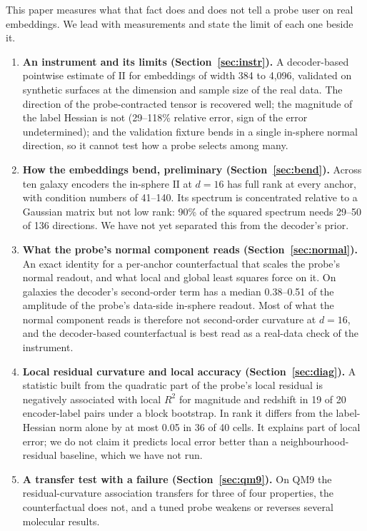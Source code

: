 \documentclass[10pt]{article}
\newcommand{\II}{\mathrm{II}}
\begin{document}
This paper measures what that fact does and does not tell a probe user on real embeddings. We lead with measurements and state the limit of each one beside it.
\begin{enumerate}
\item \textbf{An instrument and its limits (Section~\ref{sec:instr}).} A decoder-based pointwise estimate of $\II$ for embeddings of width 384 to 4{,}096, validated on synthetic surfaces at the dimension and sample size of the real data. The direction of the probe-contracted tensor is recovered well; the magnitude of the label Hessian is not (29--118\% relative error, sign of the error undetermined); and the validation fixture bends in a single in-sphere normal direction, so it cannot test how a probe selects among many.
\item \textbf{How the embeddings bend, preliminary (Section~\ref{sec:bend}).} Across ten galaxy encoders the in-sphere $\II$ at $d=16$ has full rank at every anchor, with condition numbers of 41--140. Its spectrum is concentrated relative to a Gaussian matrix but not low rank: 90\% of the squared spectrum needs 29--50 of 136 directions. We have not yet separated this from the decoder's prior.
\item \textbf{What the probe's normal component reads (Section~\ref{sec:normal}).} An exact identity for a per-anchor counterfactual that scales the probe's normal readout, and what local and global least squares force on it. On galaxies the decoder's second-order term has a median 0.38--0.51 of the amplitude of the probe's data-side in-sphere readout. Most of what the normal component reads is therefore not second-order curvature at $d=16$, and the decoder-based counterfactual is best read as a real-data check of the instrument.
\item \textbf{Local residual curvature and local accuracy (Section~\ref{sec:diag}).} A statistic built from the quadratic part of the probe's local residual is negatively associated with local $R^2$ for magnitude and redshift in 19 of 20 encoder-label pairs under a block bootstrap. In rank it differs from the label-Hessian norm alone by at most 0.05 in 36 of 40 cells. It explains part of local error; we do not claim it predicts local error better than a neighbourhood-residual baseline, which we have not run.
\item \textbf{A transfer test with a failure (Section~\ref{sec:qm9}).} On QM9 the residual-curvature association transfers for three of four properties, the counterfactual does not, and a tuned probe weakens or reverses several molecular results.
\end{enumerate}
\end{document}
